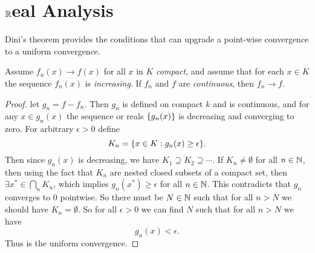 \chapter{$\mathbb{R}$eal Analysis}


Dini's theorem provides the conditions that can upgrade a point-wise convergence to a uniform convergence.
\begin{theorem}
	Assume $ f_n(x)\to f(x) $ for all $ x $ in $ K $ \emph{compact}, and assume that for each $ x\in K $ the sequence $ f_n(x) $ is \emph{increasing}. If $ f_n $ and $ f $ are \emph{continuous}, then $ f_n\to f $.
\end{theorem}
\begin{proof}
	let $ g_n = f-f_n $. Then $ g_n $ is defined on compact $ k $ and is continuous, and for any $ x\in g_n(x) $ the sequence or reals $ \{g_n(x)\} $ is decreasing and converging to zero. For arbitrary $ \epsilon>0 $ define
 	\[ K_n = \{x\in K: g_n(x)\geq \epsilon\}. \] 
 	Then since $ g_n(x) $ is decreasing, we have $ K_1 \supseteq K_2 \supseteq \cdots $. If $ K_n\neq \emptyset $ for all $ n\in \mathbb{N} $, then using the fact that $ K_n $ are nested closed subsets of a compact set, then $ \exists x^*\in \bigcap_n K_n $, which implies $ g_n(x^*)\geq \epsilon $ for all $ n\in \mathbb{N} $. This contradicts that $ g_n $ converges to $ 0 $ pointwise. So there must be $ N\in \mathbb{N} $ such that for all $ n>N $ we should have $ K_n = \emptyset $. So for all $ \epsilon>0 $ we can find $ N $ such that for all $ n>N $ we have 
 	\[ g_n(x) < \epsilon. \]
 	Thus is the uniform convergence.
\end{proof}



